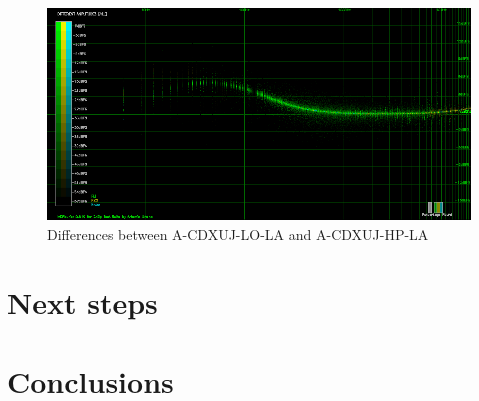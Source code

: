 \documentclass[10pt,a4paper]{report}
\begin{document}
\begin{figure}[H]
	\centering
	\includegraphics[width=1.0\linewidth]{images/results/8-A-CDXUJ-LO_LA_vs_A-CDXUJ-HP_LA.png}
	\caption[A-CDXUJ-LO-LA vs A-CDXUJ-HP-LA]{Differences between A-CDXUJ-LO-LA and A-CDXUJ-HP-LA}
	\label{fig:A-CDXUJ-LO_LA_vs_A-CDXUJ-HP_LA}
\end{figure}

\chapter{Next steps}

\chapter{Conclusions}
\end{document}
